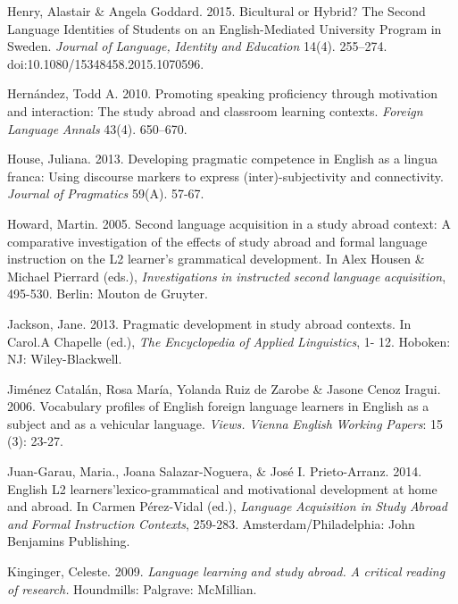 Henry, Alastair \& Angela Goddard. 2015. Bicultural or Hybrid? The Second Language Identities of Students on an English-Mediated University Program in Sweden. \textit{Journal} \textit{of} \textit{Language,} \textit{Identity} \textit{and} \textit{Education} 14(4). 255–274. doi:10.1080/15348458.2015.1070596.

Hernández, Todd A. 2010. Promoting speaking proficiency through motivation and interaction: The study abroad and classroom learning contexts. \textit{Foreign} \textit{Language} \textit{Annals} 43(4). 650–670.

House, Juliana. 2013. Developing pragmatic competence in English as a lingua franca: Using discourse markers to express (inter)-subjectivity and connectivity. \textit{Journal} \textit{of} \textit{Pragmatics} 59(A). 57-67.

Howard, Martin. 2005. Second language acquisition in a study abroad context: A comparative investigation of the effects of study abroad and formal language instruction on the L2 learner’s grammatical development. In Alex Housen \& Michael Pierrard (eds.), \textit{Investigations} \textit{in} \textit{instructed} \textit{second} \textit{language} \textit{acquisition}, 495-530. Berlin: Mouton de Gruyter.

Jackson, Jane. 2013. Pragmatic development in study abroad contexts. In Carol.A Chapelle (ed.), \textit{The} \textit{Encyclopedia} \textit{of} \textit{Applied} \textit{Linguistics}, 1- 12. Hoboken: NJ: Wiley-Blackwell. 

Jiménez Catalán, Rosa María, Yolanda Ruiz de Zarobe \& Jasone Cenoz Iragui. 2006. Vocabulary profiles of English foreign language learners in English as a subject and as a vehicular language. \textit{Views.} \textit{Vienna} \textit{English} \textit{Working} \textit{Papers}: 15 (3): 23-27. 

Juan-Garau, Maria., Joana Salazar-Noguera, \& José I. Prieto-Arranz. 2014. English L2 learners’lexico-grammatical and motivational development at home and abroad. In Carmen Pérez-Vidal (ed.), \textit{Language} \textit{Acquisition} \textit{in} \textit{Study} \textit{Abroad} \textit{and} \textit{Formal} \textit{Instruction} \textit{Contexts}, 259-283. Amsterdam/Philadelphia: John Benjamins Publishing. 

Kinginger, Celeste. 2009. \textit{Language} \textit{learning} \textit{and} \textit{study} \textit{abroad.} \textit{A} \textit{critical} \textit{reading} \textit{of} \textit{research.} Houndmills: Palgrave: McMillian.


